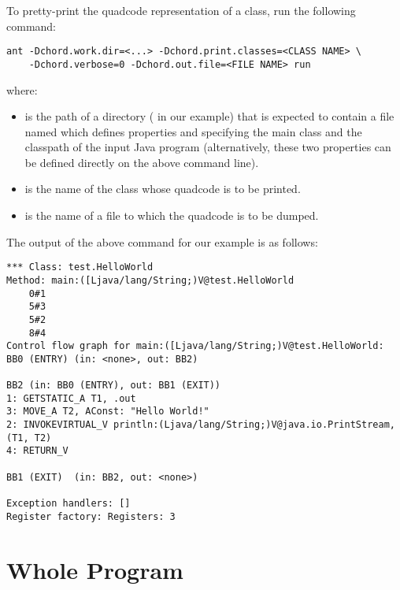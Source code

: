 To pretty-print the quadcode representation of a class, run the following command:

\begin{framed}
\begin{verbatim}
ant -Dchord.work.dir=<...> -Dchord.print.classes=<CLASS NAME> \
    -Dchord.verbose=0 -Dchord.out.file=<FILE NAME> run
\end{verbatim}
\end{framed}

where:

\begin{itemize}
\item
{} is the path of a directory ( in our example) that is expected to
contain a file named \code{chord.properties} which defines
properties  and 
specifying the main class and the classpath of the input Java program
(alternatively, these two properties can be defined directly on the
above command line).
\item
{\tt <CLASS NAME>} is the name of the class whose quadcode is to be
printed.
\item
{\tt <FILE NAME>} is the name of a file to which the quadcode is to be
dumped.
\end{itemize}

The output of the above command for our example is as follows:

\begin{framed}
\begin{verbatim}
*** Class: test.HelloWorld
Method: main:([Ljava/lang/String;)V@test.HelloWorld
    0#1
    5#3
    5#2
    8#4
Control flow graph for main:([Ljava/lang/String;)V@test.HelloWorld:
BB0 (ENTRY) (in: <none>, out: BB2)

BB2 (in: BB0 (ENTRY), out: BB1 (EXIT))
1: GETSTATIC_A T1, .out
3: MOVE_A T2, AConst: "Hello World!"
2: INVOKEVIRTUAL_V println:(Ljava/lang/String;)V@java.io.PrintStream, (T1, T2)
4: RETURN_V

BB1 (EXIT)  (in: BB2, out: <none>)

Exception handlers: []
Register factory: Registers: 3
\end{verbatim}
\end{framed}

\section{Whole Program}
\label{sec:program}

